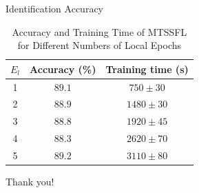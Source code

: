 \documentclass[UTF8]{beamer}
\begin{document}
\begin{frame}
{Identification Accuracy}
\begin{table}
\caption{Accuracy and Training Time of MTSSFL for Different Numbers of Local Epochs}
\begin{tabular}{ccc}
\hline$E_l$ & Accuracy (\%) & Training time (s) \\
\hline 1 & $89.1$ & $750 \pm 30$ \\
2 & $88.9$ & $1480 \pm 30$ \\
3 & $88.8$ & $1920 \pm 45$ \\
4 & $88.3$ & $2620 \pm 70$ \\
5 & $89.2$ & $3110 \pm 80$ \\
\hline
\end{tabular}
\end{table}

\end{frame}




\begin{frame}
\Huge{\centerline{Thank you!}}
\end{frame}
\end{document}
